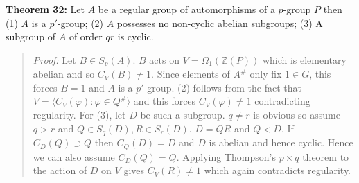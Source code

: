 {\bf Theorem 32:}
Let $A$ be a regular group of automorphisms of a $p$-group $P$ then
(1) $A$ is a $p'$-group;
(2) $A$ possesses no non-cyclic abelian subgroups;
(3) A subgroup of $A$ of order $qr$ is cyclic.
\begin{quote}
\emph{Proof:}  Let $B \in S_p(A)$.  $B$ acts on $V= \Omega_1({\mathbb Z}(P))$ which is elementary abelian
and so $C_V(B) \ne 1$.  Since elements of $A^{\#}$ only fix $1 \in G$, this forces
$B= 1$ and $A$ is a $p'$-group. (2) follows from the fact that $V= \langle C_V( \varphi): \varphi \in Q^{\#} \rangle$ and this forces $C_V(\varphi) \ne 1$
contradicting regularity.  For (3), let $D$ be such a subgroup. $q \ne r$ is obvious so
assume $q > r$ and $Q \in S_q(D), R \in S_r(D)$.  $D= QR$ and $Q \lhd D$.  If
$C_D(Q) \supset Q$ then $C_Q(D)= D$ and $D$ is abelian and hence cyclic.  Hence we
can also assume $C_D(Q)= Q$.  Applying Thompson's $p \times q$ theorem to the
action of $D$ on $V$ gives $C_V(R) \ne 1$ which again contradicts regularity.
\end{quote}
